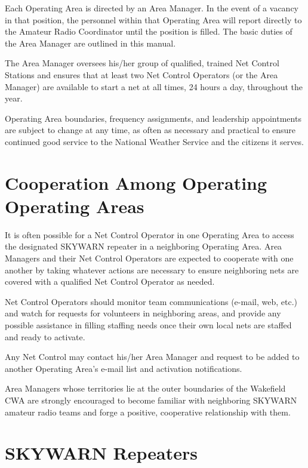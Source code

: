 \documentclass[pdflatex,letterpaper,twoside,12pt]{book}
\begin{document}
Each Operating Area is directed by an Area Manager.  In the event of a vacancy in that position, the personnel within that Operating Area will report directly to the Amateur Radio Coordinator until the position is filled.  The basic duties of the Area Manager are outlined in this manual. 

The Area Manager oversees his/her group of qualified, trained Net Control Stations and ensures that at least two Net Control Operators (or the Area Manager) are available to start a net at all times, 24 hours a day, throughout the year. 

Operating Area boundaries, frequency assignments, and leadership appointments are subject to change at any time, as often as necessary and practical to ensure continued good service to the National Weather Service and the citizens it serves.


\section{Cooperation Among Operating Operating Areas}

It is often possible for a Net Control Operator in one Operating Area to access the designated SKYWARN repeater in a neighboring Operating Area.  Area Managers and their Net Control Operators are expected to cooperate with one another by taking whatever actions are necessary to ensure neighboring nets are covered with a qualified Net Control Operator as needed. 

Net Control Operators should monitor team communications (e-mail, web, etc.) and watch for requests for volunteers in neighboring areas, and provide any possible assistance in filling staffing needs once their own local nets are staffed and ready to activate.

Any Net Control may contact his/her Area Manager and request to be added to another Operating Area's e-mail list and activation notifications.

Area Managers whose territories lie at the outer boundaries of the Wakefield CWA are strongly encouraged to become familiar with neighboring SKYWARN amateur radio teams and forge a positive, cooperative relationship with them.


\section{SKYWARN Repeaters}
\end{document}
